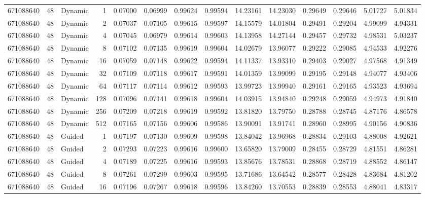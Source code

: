 \begin{tabular}{rrlrrrrrrrrrrr}
671088640 & 48 & Dynamic & 1 & 0.07000 & 0.06999 & 0.99624 & 0.99594 & 14.23161 & 14.23030 & 0.29649 & 0.29646 & 5.01727 & 5.01834 \\
671088640 & 48 & Dynamic & 2 & 0.07037 & 0.07105 & 0.99615 & 0.99597 & 14.15579 & 14.01804 & 0.29491 & 0.29204 & 4.99099 & 4.94331 \\
671088640 & 48 & Dynamic & 4 & 0.07045 & 0.06979 & 0.99614 & 0.99603 & 14.13958 & 14.27144 & 0.29457 & 0.29732 & 4.98531 & 5.03237 \\
671088640 & 48 & Dynamic & 8 & 0.07102 & 0.07135 & 0.99619 & 0.99604 & 14.02679 & 13.96077 & 0.29222 & 0.29085 & 4.94533 & 4.92276 \\
671088640 & 48 & Dynamic & 16 & 0.07059 & 0.07148 & 0.99622 & 0.99594 & 14.11337 & 13.93310 & 0.29403 & 0.29027 & 4.97568 & 4.91349 \\
671088640 & 48 & Dynamic & 32 & 0.07109 & 0.07118 & 0.99617 & 0.99591 & 14.01359 & 13.99099 & 0.29195 & 0.29148 & 4.94077 & 4.93406 \\
671088640 & 48 & Dynamic & 64 & 0.07117 & 0.07114 & 0.99612 & 0.99593 & 13.99723 & 13.99940 & 0.29161 & 0.29165 & 4.93523 & 4.93694 \\
671088640 & 48 & Dynamic & 128 & 0.07096 & 0.07141 & 0.99618 & 0.99604 & 14.03915 & 13.94840 & 0.29248 & 0.29059 & 4.94973 & 4.91840 \\
671088640 & 48 & Dynamic & 256 & 0.07209 & 0.07218 & 0.99619 & 0.99592 & 13.81820 & 13.79750 & 0.28788 & 0.28745 & 4.87176 & 4.86578 \\
671088640 & 48 & Dynamic & 512 & 0.07165 & 0.07156 & 0.99606 & 0.99586 & 13.90091 & 13.91741 & 0.28960 & 0.28995 & 4.90156 & 4.90836 \\
671088640 & 48 & Guided & 1 & 0.07197 & 0.07130 & 0.99609 & 0.99598 & 13.84042 & 13.96968 & 0.28834 & 0.29103 & 4.88008 & 4.92621 \\
671088640 & 48 & Guided & 2 & 0.07293 & 0.07223 & 0.99616 & 0.99600 & 13.65820 & 13.79009 & 0.28455 & 0.28729 & 4.81551 & 4.86281 \\
671088640 & 48 & Guided & 4 & 0.07189 & 0.07225 & 0.99616 & 0.99593 & 13.85676 & 13.78531 & 0.28868 & 0.28719 & 4.88552 & 4.86147 \\
671088640 & 48 & Guided & 8 & 0.07261 & 0.07299 & 0.99603 & 0.99595 & 13.71686 & 13.64542 & 0.28577 & 0.28428 & 4.83684 & 4.81202 \\
671088640 & 48 & Guided & 16 & 0.07196 & 0.07267 & 0.99618 & 0.99596 & 13.84260 & 13.70553 & 0.28839 & 0.28553 & 4.88041 & 4.83317 \\

\end{tabular}
